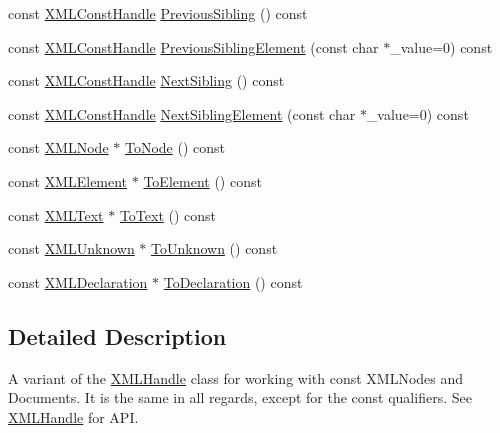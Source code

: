 \begin{DoxyCompactItemize}
\item 
const \hyperlink{classtinyxml2_1_1_x_m_l_const_handle}{X\+M\+L\+Const\+Handle} \hyperlink{classtinyxml2_1_1_x_m_l_const_handle_a6917564e26b2c20ebdcb23c7940ad80a}{Previous\+Sibling} () const 
\item 
const \hyperlink{classtinyxml2_1_1_x_m_l_const_handle}{X\+M\+L\+Const\+Handle} \hyperlink{classtinyxml2_1_1_x_m_l_const_handle_acb2e1c5762eff9f6ed72d1a2dfc14271}{Previous\+Sibling\+Element} (const char $\ast$\+\_\+value=0) const 
\item 
const \hyperlink{classtinyxml2_1_1_x_m_l_const_handle}{X\+M\+L\+Const\+Handle} \hyperlink{classtinyxml2_1_1_x_m_l_const_handle_a596e248c8014d718f41658502a2e221b}{Next\+Sibling} () const 
\item 
const \hyperlink{classtinyxml2_1_1_x_m_l_const_handle}{X\+M\+L\+Const\+Handle} \hyperlink{classtinyxml2_1_1_x_m_l_const_handle_a3bbdd3d866c750473bd69a232704503b}{Next\+Sibling\+Element} (const char $\ast$\+\_\+value=0) const 
\item 
const \hyperlink{classtinyxml2_1_1_x_m_l_node}{X\+M\+L\+Node} $\ast$ \hyperlink{classtinyxml2_1_1_x_m_l_const_handle_a95d0256318c10c3f75fa5f8ffb3e4bc1}{To\+Node} () const 
\item 
const \hyperlink{classtinyxml2_1_1_x_m_l_element}{X\+M\+L\+Element} $\ast$ \hyperlink{classtinyxml2_1_1_x_m_l_const_handle_a5a48adefc2a5e70d4ce5b55692a0e2f9}{To\+Element} () const 
\item 
const \hyperlink{classtinyxml2_1_1_x_m_l_text}{X\+M\+L\+Text} $\ast$ \hyperlink{classtinyxml2_1_1_x_m_l_const_handle_ad86ca7dbb20d0495ae357fe7a866e0be}{To\+Text} () const 
\item 
const \hyperlink{classtinyxml2_1_1_x_m_l_unknown}{X\+M\+L\+Unknown} $\ast$ \hyperlink{classtinyxml2_1_1_x_m_l_const_handle_acb358a329e54fa204ed2d0b181566828}{To\+Unknown} () const 
\item 
const \hyperlink{classtinyxml2_1_1_x_m_l_declaration}{X\+M\+L\+Declaration} $\ast$ \hyperlink{classtinyxml2_1_1_x_m_l_const_handle_a5de0c175845bc30a6f9b3d88d8877eaf}{To\+Declaration} () const 
\end{DoxyCompactItemize}


\subsection{Detailed Description}
A variant of the \hyperlink{classtinyxml2_1_1_x_m_l_handle}{X\+M\+L\+Handle} class for working with const X\+M\+L\+Nodes and Documents. It is the same in all regards, except for the \textquotesingle{}const\textquotesingle{} qualifiers. See \hyperlink{classtinyxml2_1_1_x_m_l_handle}{X\+M\+L\+Handle} for A\+P\+I. 


